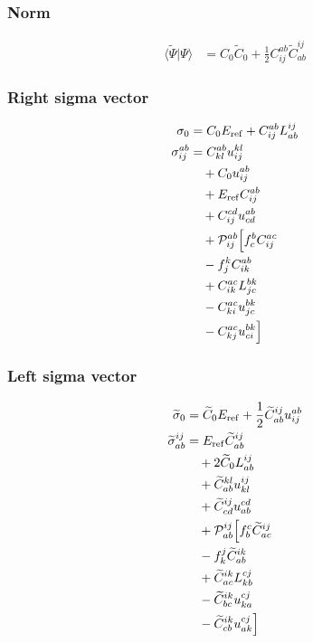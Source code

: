 
\subsubsection{Norm}
\begin{align*}
\langle\widetilde{\Psi}\vert\Psi\rangle &= C_{0} \widetilde{C}_{0}   + \frac{1}{2} C^{ab}_{ij}  \widetilde{C}^{ij}_{ab}
\end{align*}

\subsubsection{Right sigma vector}
\begin{align*}
\sigma_{0} &= C_{0} E_{\mathrm{ref}}   + C^{ab}_{ij}  L^{ij}_{ab} \\
\sigma^{ab}_{ij} &= C^{ab}_{kl}  u^{kl}_{ij}  \\
  &\quad  + C_{0} u^{ab}_{ij}  \\
  &\quad  + E_{\mathrm{ref}} C^{ab}_{ij}  \\
  &\quad  + C^{cd}_{ij}  u^{ab}_{cd} \\
  &\quad + \mathcal{P}^{ab}_{ij}\Bigl[ f^{b}_{c}  C^{ac}_{ij}  \\
  &\quad - f^{k}_{j}  C^{ab}_{ik}  \\
  &\quad  + C^{ac}_{ik}  L^{bk}_{jc}  \\
  &\quad - C^{ac}_{ki}  u^{bk}_{jc}  \\
  &\quad - C^{ac}_{kj}  u^{bk}_{ci} \Bigr]
\end{align*}

\subsubsection{Left sigma vector}
\begin{align*}
\widetilde{\sigma}_{0} &= \widetilde{C}_{0} E_{\mathrm{ref}}   + \frac{1}{2} \widetilde{C}^{ij}_{ab}  u^{ab}_{ij} \\
\widetilde{\sigma}^{ij}_{ab} &= E_{\mathrm{ref}} \widetilde{C}^{ij}_{ab}  \\
  &\quad  + 2 \widetilde{C}_{0} L^{ij}_{ab}  \\
  &\quad  + \widetilde{C}^{kl}_{ab}  u^{ij}_{kl}  \\
  &\quad  + \widetilde{C}^{ij}_{cd}  u^{cd}_{ab} \\
  &\quad + \mathcal{P}^{ij}_{ab}\Bigl[ f^{c}_{b}  \widetilde{C}^{ij}_{ac}  \\
  &\quad - f^{j}_{k}  \widetilde{C}^{ik}_{ab}  \\
  &\quad  + \widetilde{C}^{ik}_{ac}  L^{cj}_{kb}  \\
  &\quad - \widetilde{C}^{ik}_{bc}  u^{cj}_{ka}  \\
  &\quad - \widetilde{C}^{ik}_{cb}  u^{cj}_{ak} \Bigr]
\end{align*}

